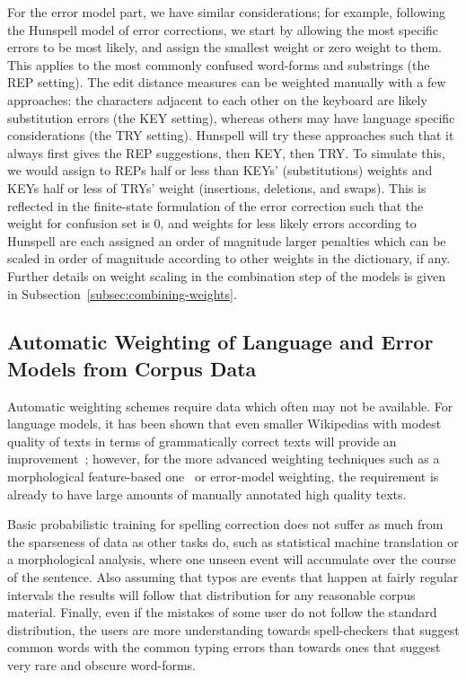 \documentclass[a4paper,12pt]{article}
\begin{document}
For the error model part, we have similar considerations; for example,
following the Hunspell model of error corrections, we start by allowing the
most specific errors to be most likely, and assign the smallest weight or zero
weight to them. This applies to the most commonly confused word-forms and
substrings (the REP setting). The edit distance measures can be weighted
manually with a few approaches: the characters adjacent to each other on the
keyboard are likely substitution errors (the KEY setting), whereas others may
have language specific considerations (the TRY setting). Hunspell will try
these approaches such that it always first gives the REP suggestions, then KEY,
then TRY. To simulate this, we would assign to REPs half or less than KEYs'
(substitutions) weights and KEYs half or less of TRYs' weight (insertions,
deletions, and swaps). This is reflected in the finite-state formulation of the
error correction such that the weight for confusion set is 0, and weights for
less likely errors according to Hunspell are each assigned an order of
magnitude larger penalties which can be scaled in order of magnitude according
to other weights in the dictionary, if any. Further details on weight scaling
in the combination step of the models is given in
Subsection~\ref{subsec:combining-weights}.

\subsection{Automatic Weighting of Language and Error Models from Corpus Data}
\label{subsec:automatic-weighting}

Automatic weighting schemes require data which often may not be available.
For language models, it has been shown that even smaller Wikipedias
with modest quality of texts in terms of grammatically correct texts will
provide an improvement~\cite[]{pirinen/2010/lrec}; however, for the more
advanced weighting techniques such as a morphological feature-based
one~\cite[]{pirinen2012improving} or error-model weighting, the requirement
is already to have large amounts of manually annotated high quality texts.

Basic probabilistic training for spelling correction does not suffer as much
from the sparseness of data as other tasks do, such as statistical machine
translation or a morphological analysis, where one unseen event will
accumulate over the course of the sentence. Also assuming that typos are
events that happen at fairly regular intervals the results will follow that
distribution for any reasonable corpus material. Finally, even if the mistakes
of some user do not follow the standard distribution, the users are more
understanding towards spell-checkers that suggest common words with the
common typing errors than towards ones that suggest very rare and obscure
word-forms.
\end{document}
